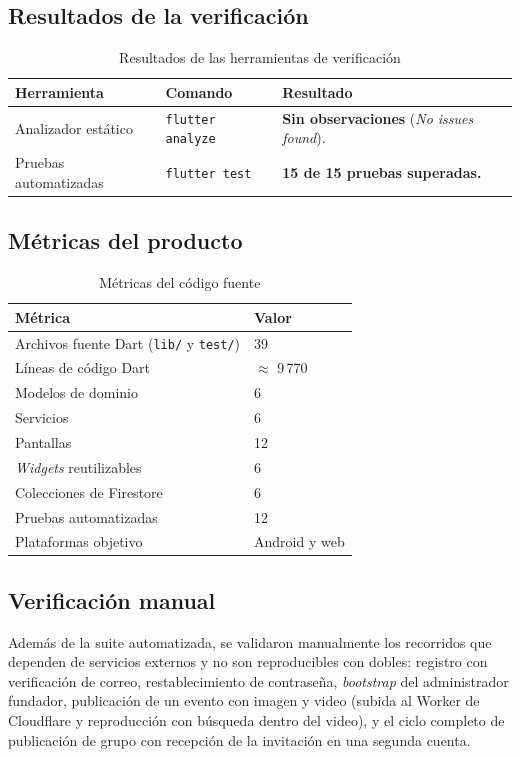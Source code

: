 \documentclass[12pt,a4paper]{article}
\begin{document}
\subsection{Resultados de la verificación}
\begin{table}[htbp]
\centering
\caption{Resultados de las herramientas de verificación}
\begin{tabular}{L{4.6cm}L{4.0cm}L{5.0cm}}
\toprule
\textbf{Herramienta} & \textbf{Comando} & \textbf{Resultado} \\
\midrule
Analizador estático & \texttt{flutter analyze} & \textbf{Sin observaciones} (\emph{No issues found}). \\
Pruebas automatizadas & \texttt{flutter test} & \textbf{15 de 15 pruebas superadas.} \\
\bottomrule
\end{tabular}
\end{table}

\subsection{Métricas del producto}
\begin{table}[htbp]
\centering
\caption{Métricas del código fuente}
\begin{tabular}{L{7.5cm}L{5.5cm}}
\toprule
\textbf{Métrica} & \textbf{Valor} \\
\midrule
Archivos fuente Dart (\texttt{lib/} y \texttt{test/}) & 39 \\
Líneas de código Dart & $\approx$ 9\,770 \\
Modelos de dominio & 6 \\
Servicios & 6 \\
Pantallas & 12 \\
\emph{Widgets} reutilizables & 6 \\
Colecciones de Firestore & 6 \\
Pruebas automatizadas & 12 \\
Plataformas objetivo & Android y web \\
\bottomrule
\end{tabular}
\end{table}

\subsection{Verificación manual}
Además de la suite automatizada, se validaron manualmente los recorridos que dependen de servicios externos y no son reproducibles con dobles: registro con verificación de correo, restablecimiento de contraseña, \emph{bootstrap} del administrador fundador, publicación de un evento con imagen y video (subida al Worker de Cloudflare y reproducción con búsqueda dentro del video), y el ciclo completo de publicación de grupo con recepción de la invitación en una segunda cuenta.
\end{document}
